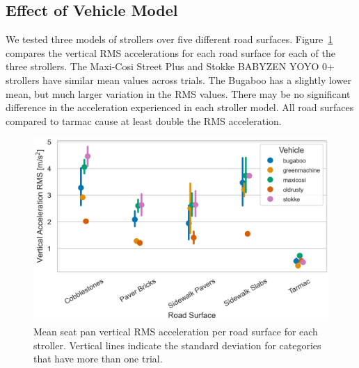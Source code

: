 \documentclass[a4paper]{article}
\begin{document}
\subsection{Effect of Vehicle Model}
%
We tested three models of strollers over five different road surfaces.
Figure~\ref{fig:stroller-type-compare} compares the vertical RMS accelerations
for each road surface for each of the three strollers. The Maxi-Cosi Street Plus
and Stokke BABYZEN YOYO 0+ strollers have similar mean values across trials. The
Bugaboo has a slightly lower mean, but much larger variation in the RMS values.
There may be no significant difference in the acceleration experienced in each
stroller model. All road surfaces compared to tarmac cause at least double the
RMS acceleration.
%
\begin{figure}
  \centering
  \includegraphics[width=160mm]{fig/SeatBotacc_ver-stroller-type-compare.png}
  \caption{Mean seat pan vertical RMS acceleration per road surface for each
  stroller. Vertical lines indicate the standard deviation for categories that
  have more than one trial.} 
  \label{fig:stroller-type-compare}
\end{figure}
\end{document}
